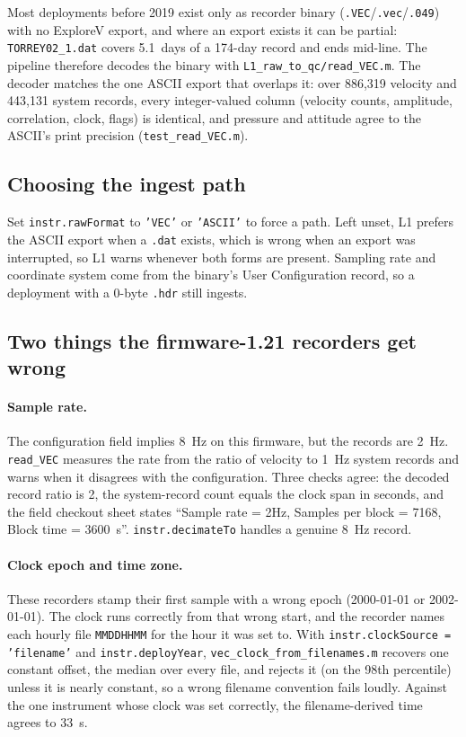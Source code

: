 \documentclass[11pt]{article}
\newcommand{\code}[1]{\texttt{#1}}
\begin{document}
Most deployments before 2019 exist only as recorder binary (\code{.VEC}/\code{.vec}/\code{.049})
with no ExploreV export, and where an export exists it can be partial: \code{TORREY02\_1.dat}
covers 5.1~days of a 174-day record and ends mid-line. The pipeline therefore decodes the binary
with \code{L1\_raw\_to\_qc/read\_VEC.m}. The decoder matches the one ASCII export that overlaps
it: over 886{,}319 velocity and 443{,}131 system records, every integer-valued column (velocity
counts, amplitude, correlation, clock, flags) is identical, and pressure and attitude agree to
the ASCII's print precision (\code{test\_read\_VEC.m}).

\subsection{Choosing the ingest path}

Set \code{instr.rawFormat} to \code{'VEC'} or \code{'ASCII'} to force a path. Left unset, L1
prefers the ASCII export when a \code{.dat} exists, which is wrong when an export was
interrupted, so L1 warns whenever both forms are present. Sampling rate and coordinate system
come from the binary's User Configuration record, so a deployment with a 0-byte \code{.hdr}
still ingests.

\subsection{Two things the firmware-1.21 recorders get wrong}

\paragraph{Sample rate.} The configuration field implies 8~Hz on this firmware, but the records
are 2~Hz. \code{read\_VEC} measures the rate from the ratio of velocity to 1~Hz system records
and warns when it disagrees with the configuration. Three checks agree: the decoded record
ratio is 2, the system-record count equals the clock span in seconds, and the field checkout
sheet states ``Sample rate = 2Hz, Samples per block = 7168, Block time = 3600~s''.
\code{instr.decimateTo} handles a genuine 8~Hz record.

\paragraph{Clock epoch and time zone.} These recorders stamp their first sample with a wrong
epoch (2000-01-01 or 2002-01-01). The clock runs correctly from that wrong start, and the
recorder names each hourly file \code{MMDDHHMM} for the hour it was set to. With
\code{instr.clockSource = 'filename'} and \code{instr.deployYear},
\code{vec\_clock\_from\_filenames.m} recovers one constant offset, the median over every file,
and rejects it (on the 98th percentile) unless it is nearly constant, so a wrong filename
convention fails loudly. Against the one instrument whose clock was set correctly, the
filename-derived time agrees to 33~s.
\end{document}
